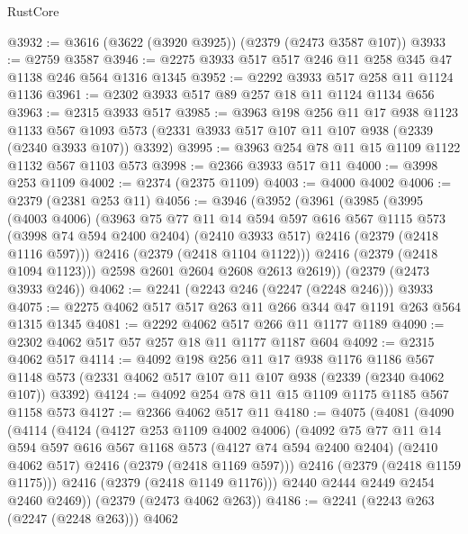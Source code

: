 \begin{lexlean}{RustCore}
\begin{coremodule}
@3932 := @3616 (@3622 (@3920 @3925)) (@2379 (@2473 @3587 @107))
@3933 := @2759 @3587
@3946 := @2275 @3933 @517 @517 @246 @11 @258 @345 @47 @1138 @246 @564 @1316 @1345
@3952 := @2292 @3933 @517 @258 @11 @1124 @1136
@3961 := @2302 @3933 @517 @89 @257 @18 @11 @1124 @1134 @656
@3963 := @2315 @3933 @517
@3985 := @3963
    @198
    @256
    @11
    @17
    @938
    @1123
    @1133
    @567
    @1093
    @573
    (@2331 @3933 @517 @107 @11 @107 @938 (@2339 (@2340 @3933 @107)) @3392)
@3995 := @3963 @254 @78 @11 @15 @1109 @1122 @1132 @567 @1103 @573
@3998 := @2366 @3933 @517 @11
@4000 := @3998 @253 @1109
@4002 := @2374 (@2375 @1109)
@4003 := @4000 @4002
@4006 := @2379 (@2381 @253 @11)
@4056 := @3946
    (@3952
      (@3961
        (@3985
          (@3995
            (@4003 @4006)
            (@3963
              @75
              @77
              @11
              @14
              @594
              @597
              @616
              @567
              @1115
              @573
              (@3998 @74 @594 @2400 @2404)
              (@2410 @3933 @517)
              @2416
              (@2379 (@2418 @1116 @597)))
            @2416
            (@2379 (@2418 @1104 @1122)))
          @2416
          (@2379 (@2418 @1094 @1123)))
        @2598
        @2601
        @2604
        @2608
        @2613
        @2619))
    (@2379 (@2473 @3933 @246))
@4062 := @2241 (@2243 @246 (@2247 (@2248 @246))) @3933
@4075 := @2275 @4062 @517 @517 @263 @11 @266 @344 @47 @1191 @263 @564 @1315 @1345
@4081 := @2292 @4062 @517 @266 @11 @1177 @1189
@4090 := @2302 @4062 @517 @57 @257 @18 @11 @1177 @1187 @604
@4092 := @2315 @4062 @517
@4114 := @4092
    @198
    @256
    @11
    @17
    @938
    @1176
    @1186
    @567
    @1148
    @573
    (@2331 @4062 @517 @107 @11 @107 @938 (@2339 (@2340 @4062 @107)) @3392)
@4124 := @4092 @254 @78 @11 @15 @1109 @1175 @1185 @567 @1158 @573
@4127 := @2366 @4062 @517 @11
@4180 := @4075
    (@4081
      (@4090
        (@4114
          (@4124
            (@4127 @253 @1109 @4002 @4006)
            (@4092
              @75
              @77
              @11
              @14
              @594
              @597
              @616
              @567
              @1168
              @573
              (@4127 @74 @594 @2400 @2404)
              (@2410 @4062 @517)
              @2416
              (@2379 (@2418 @1169 @597)))
            @2416
            (@2379 (@2418 @1159 @1175)))
          @2416
          (@2379 (@2418 @1149 @1176)))
        @2440
        @2444
        @2449
        @2454
        @2460
        @2469))
    (@2379 (@2473 @4062 @263))
@4186 := @2241 (@2243 @263 (@2247 (@2248 @263))) @4062

\end{coremodule}
\end{lexlean}
